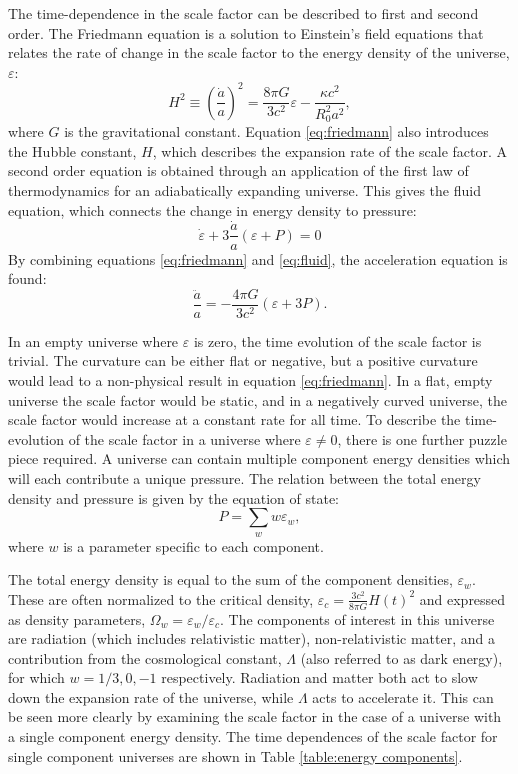 The time-dependence in the scale factor can be described to first and second order. The Friedmann equation is a solution to Einstein's field equations that relates the rate of change in the scale factor to the energy density of the universe, $\varepsilon$:
\begin{equation}\label{eq:friedmann}
H^2 \equiv \left( \frac{\dot{a}}{a} \right)^2 = \frac{8\pi G}{3c^2}\varepsilon - \frac{\kappa c^2}{R_{0}^{2}a^2},
\end{equation}
where $G$ is the gravitational constant. Equation \ref{eq:friedmann} also introduces the Hubble constant, $H$, which describes the expansion rate of the scale factor. A second order equation is obtained through an application of the first law of thermodynamics for an adiabatically expanding universe. This gives the fluid equation, which connects the change in energy density to pressure:
\begin{equation}\label{eq:fluid}
\dot{\varepsilon} + 3 \frac{\dot{a}}{a}(\varepsilon +P)=0 
\end{equation}
By combining equations \ref{eq:friedmann} and \ref{eq:fluid}, the acceleration equation is found:
\begin{equation}\label{eq:accel}
\frac{\ddot{a}}{a} =  -\frac{4\pi G}{3c^2}(\varepsilon+3P).
\end{equation}

In an empty universe where $\varepsilon$ is zero, the time evolution of the scale factor is trivial. The curvature can be either flat or negative, but a positive curvature would lead to a non-physical result in equation \ref{eq:friedmann}. In a flat, empty universe the scale factor would be static, and in a negatively curved universe, the scale factor would increase at a constant rate for all time. To describe the time-evolution of the scale factor in a universe where $\varepsilon \neq 0$, there is one further puzzle piece required. A universe can contain multiple component energy densities which will each contribute a unique pressure. The relation between the total energy density and pressure is given by the equation of state:
\begin{equation}
P= \sum_w w\varepsilon_w,
\end{equation}
where $w$ is a parameter specific to each component.

The total energy density is equal to the sum of the component densities, $\varepsilon_{w}$. These are often normalized to the critical density, $\varepsilon_{c} = \frac{3c^2}{8\pi G}H(t)^2$ and expressed as density parameters, $\Omega_{w}=\varepsilon_{w}/\varepsilon_{c}$. The components of interest in this universe are radiation (which includes relativistic matter), non-relativistic matter, and a contribution from the cosmological constant, $\Lambda$ (also referred to as dark energy), for which $w = 1/3, 0, -1$ respectively. Radiation and matter both act to slow down the expansion rate of the universe, while $\Lambda$ acts to accelerate it. This can be seen more clearly by examining the scale factor in the case of a universe with a single component energy density. The time dependences of the scale factor for single component universes are shown in Table \ref{table:energy components}.

